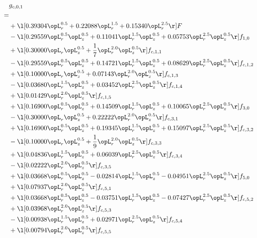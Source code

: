 \begin{alignat}{2} 
\label{eq:g_01_0} 
& g_{c,0,1} \nonumber \\ 
 = \\ 
& + \l[  0.39304 \opL_r^{0.5} +  0.22088 \opL_r^{1.5} +  0.15340 \opL_r^{2.5}  \r] F \nonumber \\ 
& - \l[  0.29559 \opL_r^{0.5} \opL_z^{0.5} +  0.11041 \opL_r^{1.5} \opL_z^{0.5} +  0.05753 \opL_r^{2.5} \opL_z^{0.5}  \r] f_{1,0} \nonumber \\ 
& + \l[  0.30000 \opL_r \opL_z^{0.5} + \frac{1}{7} \opL_r^{2.0} \opL_z^{0.5}  \r] f_{c,1,1} \nonumber \\ 
& - \l[  0.29559 \opL_r^{0.5} \opL_z^{0.5} +  0.14721 \opL_r^{1.5} \opL_z^{0.5} +  0.08629 \opL_r^{2.5} \opL_z^{0.5}  \r] f_{c,1,2} \nonumber \\ 
& + \l[  0.10000 \opL_r \opL_z^{0.5} +  0.07143 \opL_r^{2.0} \opL_z^{0.5}  \r] f_{c,1,3} \nonumber \\ 
& - \l[  0.03680 \opL_r^{1.5} \opL_z^{0.5} +  0.03452 \opL_r^{2.5} \opL_z^{0.5}  \r] f_{c,1,4} \nonumber \\ 
& + \l[  0.01429 \opL_r^{2.0} \opL_z^{0.5}  \r] f_{c,1,5} \nonumber \\ 
& + \l[  0.16900 \opL_r^{0.5} \opL_z^{0.5} +  0.14509 \opL_r^{1.5} \opL_z^{0.5} +  0.10065 \opL_r^{2.5} \opL_z^{0.5}  \r] f_{3,0} \nonumber \\ 
& - \l[  0.30000 \opL_r \opL_z^{0.5} +  0.22222 \opL_r^{2.0} \opL_z^{0.5}  \r] f_{c,3,1} \nonumber \\ 
& + \l[  0.16900 \opL_r^{0.5} \opL_z^{0.5} +  0.19345 \opL_r^{1.5} \opL_z^{0.5} +  0.15097 \opL_r^{2.5} \opL_z^{0.5}  \r] f_{c,3,2} \nonumber \\ 
& - \l[  0.10000 \opL_r \opL_z^{0.5} + \frac{1}{9} \opL_r^{2.0} \opL_z^{0.5}  \r] f_{c,3,3} \nonumber \\ 
& + \l[  0.04836 \opL_r^{1.5} \opL_z^{0.5} +  0.06039 \opL_r^{2.5} \opL_z^{0.5}  \r] f_{c,3,4} \nonumber \\ 
& - \l[  0.02222 \opL_r^{2.0} \opL_z^{0.5}  \r] f_{c,3,5} \nonumber \\ 
& + \l[  0.03668 \opL_r^{0.5} \opL_z^{0.5}   -0.02814 \opL_r^{1.5} \opL_z^{0.5}   -0.04951 \opL_r^{2.5} \opL_z^{0.5}  \r] f_{5,0} \nonumber \\ 
& + \l[  0.07937 \opL_r^{2.0} \opL_z^{0.5}  \r] f_{c,5,1} \nonumber \\ 
& + \l[  0.03668 \opL_r^{0.5} \opL_z^{0.5}   -0.03751 \opL_r^{1.5} \opL_z^{0.5}   -0.07427 \opL_r^{2.5} \opL_z^{0.5}  \r] f_{c,5,2} \nonumber \\ 
& + \l[  0.03968 \opL_r^{2.0} \opL_z^{0.5}  \r] f_{c,5,3} \nonumber \\ 
& - \l[  0.00938 \opL_r^{1.5} \opL_z^{0.5} +  0.02971 \opL_r^{2.5} \opL_z^{0.5}  \r] f_{c,5,4} \nonumber \\ 
& + \l[  0.00794 \opL_r^{2.0} \opL_z^{0.5}  \r] f_{c,5,5} \nonumber \\ 
\end{alignat} 


